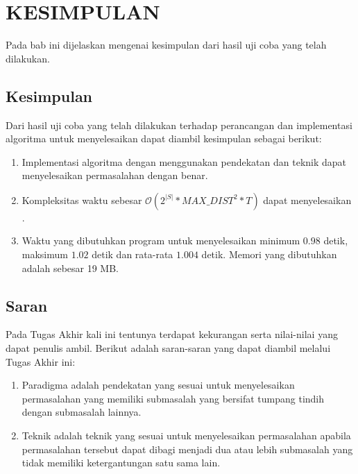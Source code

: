 \chapter{KESIMPULAN}

Pada bab ini dijelaskan mengenai kesimpulan dari hasil uji coba yang telah dilakukan.

\section{Kesimpulan}

Dari hasil uji coba yang telah dilakukan terhadap perancangan dan implementasi algoritma untuk menyelesaikan \problem{} dapat diambil kesimpulan sebagai berikut:

\begin{enumerate}
	\item Implementasi algoritma dengan menggunakan pendekatan \dynamicprogramming{} dan teknik \meetinthemiddle{} dapat menyelesaikan permasalahan \problem{} dengan benar.
	\item Kompleksitas waktu sebesar $ \mathcal{O}(2^{|S|} * MAX\_DIST^{2} * T) $ dapat menyelesaikan \problem{}.
	\item Waktu yang dibutuhkan program untuk menyelesaikan \problem{} minimum $ 0.98 $ detik, maksimum $ 1.02 $ detik dan rata-rata $ 1.004 $ detik. Memori yang dibutuhkan adalah sebesar 19 MB.
\end{enumerate}

\section{Saran}

Pada Tugas Akhir kali ini tentunya terdapat kekurangan serta nilai-nilai yang dapat penulis ambil. Berikut adalah saran-saran yang dapat diambil melalui Tugas Akhir ini:

\begin{enumerate}
	\item Paradigma \dynamicprogramming{} adalah pendekatan yang sesuai untuk menyelesaikan permasalahan yang memiliki submasalah yang bersifat tumpang tindih dengan submasalah lainnya.
	\item Teknik \meetinthemiddle{} adalah teknik yang sesuai untuk menyelesaikan permasalahan apabila permasalahan tersebut dapat dibagi menjadi dua atau lebih submasalah yang tidak memiliki ketergantungan satu sama lain.
\end{enumerate}